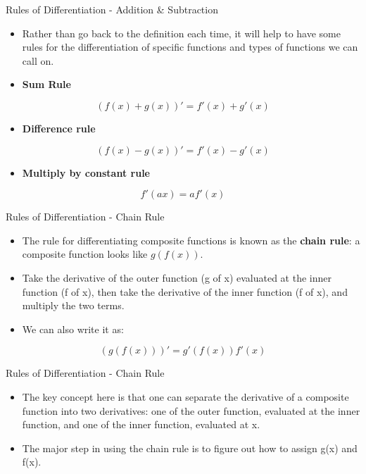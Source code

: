 \documentclass[
  ignorenonframetext,
]{beamer}
\providecommand{\tightlist}{%
  \setlength{\itemsep}{0pt}\setlength{\parskip}{0pt}}
\begin{document}
\begin{frame}{Rules of Differentiation - Addition \& Subtraction}
\protect\hypertarget{rules-of-differentiation---addition-subtraction}{}

\begin{itemize}
\item
  Rather than go back to the definition each time, it will help to have
  some rules for the differentiation of specific functions and types of
  functions we can call on.
\item
  \textbf{Sum Rule}
\end{itemize}

\[(f(x) + g(x))′ = f′(x) + g′(x)\]

\begin{itemize}
\tightlist
\item
  \textbf{Difference rule}
\end{itemize}

\[(f(x) − g(x))′ = f′(x) − g′(x)\]

\begin{itemize}
\tightlist
\item
  \textbf{Multiply by constant rule}
\end{itemize}

\[f′(ax) = af′(x)\]

\end{frame}

\begin{frame}{Rules of Differentiation - Chain Rule}
\protect\hypertarget{rules-of-differentiation---chain-rule}{}

\begin{itemize}
\item
  The rule for differentiating composite functions is known as the
  \textbf{chain rule}: a composite function looks like \(g(f(x))\).
\item
  Take the derivative of the outer function (g of x) evaluated at the
  inner function (f of x), then take the derivative of the inner
  function (f of x), and multiply the two terms.
\item
  We can also write it as:
\end{itemize}

\[(g(f(x)))′ = g′(f(x))f′(x)\]

\end{frame}

\begin{frame}{Rules of Differentiation - Chain Rule}
\protect\hypertarget{rules-of-differentiation---chain-rule-1}{}

\begin{itemize}
\item
  The key concept here is that one can separate the derivative of a
  composite function into two derivatives: one of the outer function,
  evaluated at the inner function, and one of the inner function,
  evaluated at x.
\item
  The major step in using the chain rule is to figure out how to assign
  g(x) and f(x).
\end{itemize}

\end{frame}
\end{document}
